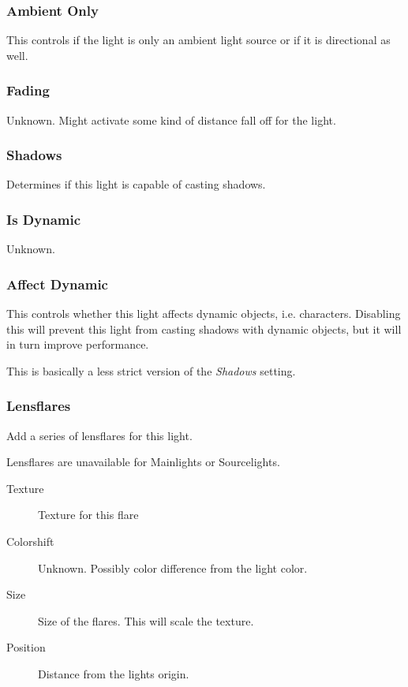 \subsubsection*{Ambient Only}
This controls if the light is only an ambient light source or
if it is directional as well.

\subsubsection*{Fading}
Unknown. Might activate some kind of distance fall off for the light.

\subsubsection*{Shadows}
Determines if this light is capable of casting shadows.

\subsubsection*{Is Dynamic}
Unknown.

\subsubsection*{Affect Dynamic}
This controls whether this light affects dynamic objects, i.e. characters.
Disabling this will prevent this light from casting shadows with dynamic
objects, but it will in turn improve performance.

This is basically a less strict version of the \textit{Shadows} setting.

\subsubsection*{Lensflares}
Add a series of lensflares for this light.

Lensflares are unavailable for Mainlights or Sourcelights.
\begin{description}
    \item[Texture] Texture for this flare
    \item[Colorshift] Unknown. Possibly color difference from the light color.
    \item[Size] Size of the flares. This will scale the texture.
    \item[Position] Distance from the lights origin.
\end{description}
